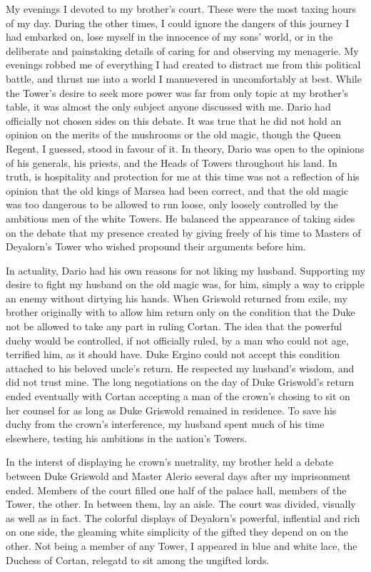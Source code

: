 \documentclass{article}
\begin{document}
My evenings I devoted to my brother's court. These were the most taxing hours of my day. During the other times, I could ignore the dangers of this journey I had embarked on, lose myself in the innocence of my sons' world, or in the deliberate and painstaking details of caring for and observing my menagerie. My evenings robbed me of everything I had created to distract me from this political battle, and thrust me into a world I manuevered in uncomfortably at best. While the Tower's desire to seek more power was far from only topic at my brother's table, it was almost the only subject anyone discussed with me. Dario had officially not chosen sides on this debate. It was true that he did not hold an opinion on the merits of the mushrooms or the old magic, though the Queen Regent, I guessed, stood in favour of it. In theory, Dario was open to the opinions of his generals, his priests, and the Heads of Towers throughout his land. In truth, is hospitality and protection for me at this time was not a reflection of his opinion that the old kings of Marsea had been correct, and that the old magic was too dangerous to be allowed to run loose, only loosely controlled by the ambitious men of the white Towers. He balanced the appearance of taking sides on the debate that my presence created by giving freely of his time to Masters of Deyalorn's Tower who wished propound their arguments before him. 

In actuality, Dario had his own reasons for not liking my husband. Supporting my desire to fight my husband on the old magic was, for him, simply a way to cripple an enemy without dirtying his hands. When Griswold returned from exile, my brother originally with to allow him return only on the condition that the Duke not be allowed to take any part in ruling Cortan. The idea that the powerful duchy would be controlled, if not officially ruled, by a man who could not age, terrified him, as it should have. Duke Ergino could not accept this condition attached to his beloved uncle's return. He respected my husband's wisdom, and did not trust mine. The long negotiations on the day of Duke Griswold's return ended eventually with Cortan accepting a man of the crown's chosing to sit on her counsel for as long as Duke Griswold remained in residence. To save his duchy from the crown's interference, my husband spent much of his time elsewhere, testing his ambitions in the nation's Towers. 

In the interst of displaying he crown's nuetrality, my brother held a debate between Duke Griswold and Master Alerio several days after my imprisonment ended. Members of the court filled one half of the palace hall, members of the Tower, the other. In between them, lay an aisle. The court was divided, visually as well as in fact. The colorful displays of Deyalorn's powerful, inflential and rich on one side, the gleaming white simplicity of the gifted they depend on on the other. Not being a member of any Tower, I appeared in blue and white lace, the Duchess of Cortan, relegatd to sit among the ungifted lords. 
\end{document}

